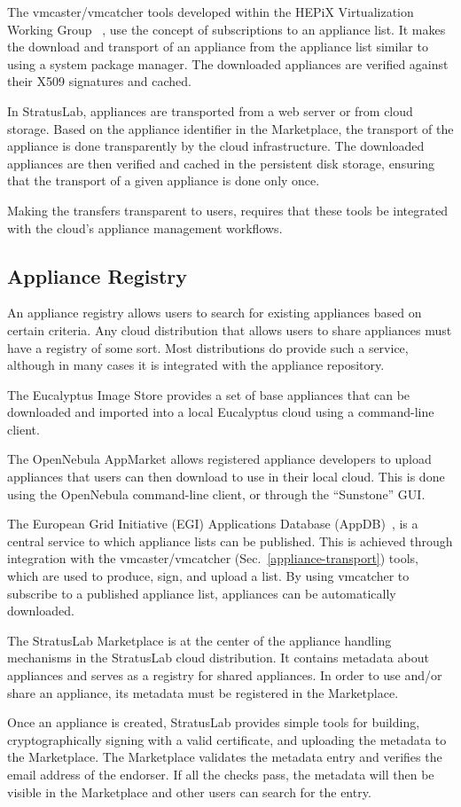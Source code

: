 The vmcaster/vmcatcher tools developed within the HEPiX Virtualization
Working Group ~\cite{hepixbooktransfer}, use the concept of
subscriptions to an appliance list. It makes the download and
transport of an appliance from the appliance list similar to using a
system package manager.  The downloaded appliances are verified
against their X509 signatures and cached.

In StratusLab, appliances are transported from a web server or from
cloud storage. Based on the appliance identifier in the Marketplace,
the transport of the appliance is done transparently by the cloud
infrastructure.  The downloaded appliances are then verified and
cached in the persistent disk storage, ensuring that the transport of
a given appliance is done only once.

Making the transfers transparent to users, requires that these tools
be integrated with the cloud's appliance management workflows.

\subsection{Appliance Registry}

An appliance registry allows users to search for existing appliances
based on certain criteria.  Any cloud distribution that allows users
to share appliances must have a registry of some sort. Most
distributions do provide such a service, although in many cases it is
integrated with the appliance repository.

The Eucalyptus Image Store provides a set of base appliances that can
be downloaded and imported into a local Eucalyptus cloud using a
command-line client.

The OpenNebula AppMarket allows registered appliance developers to
upload appliances that users can then download to use in their local
cloud. This is done using the OpenNebula command-line client, or
through the ``Sunstone'' GUI.

The European Grid Initiative (EGI) Applications Database (AppDB)~\cite{AppDB}, 
is a central service to which appliance lists can be published. This is 
achieved through integration with the vmcaster/vmcatcher (Sec.~\ref{appliance-transport}) 
tools, which are used to produce, sign, and upload a list. By using 
vmcatcher to subscribe to a published appliance list, appliances 
can be automatically downloaded.
 
The StratusLab Marketplace is at the center of the appliance handling
mechanisms in the StratusLab cloud distribution. It contains metadata
about appliances and serves as a registry for shared appliances.  In
order to use and/or share an appliance, its metadata must be
registered in the Marketplace\@.

Once an appliance is created, StratusLab provides simple tools for
building, cryptographically signing with a valid certificate, and
uploading the metadata to the Marketplace\@.  The Marketplace
validates the metadata entry and verifies the email address of the
endorser.  If all the checks pass, the metadata will then be visible
in the Marketplace and other users can search for the entry.
